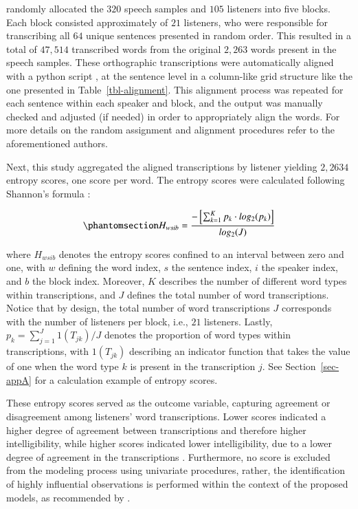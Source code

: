 \documentclass[
  authoryear,
  preprint,
  1p]{elsarticle}
\begin{document}
{\citet{Boonen_et_al_2021} randomly allocated the \(320\) speech samples
and \(105\) listeners into five blocks. Each block consisted
approximately of \(21\) listeners, who were responsible for transcribing
all \(64\) unique sentences presented in random order.} This resulted in
a total of \(47,514\) transcribed words from the original \(2,263\)
words present in the speech samples. These orthographic transcriptions
were automatically aligned with a python script
\citep{Boonen_et_al_2021}, at the sentence level in a column-like grid
structure like the one presented in Table~\ref{tbl-alignment}. This
alignment process was repeated for each sentence within each speaker and
block, and the output was manually checked and adjusted (if needed) in
order to appropriately align the words. {For more details on the random
assignment and alignment procedures refer to the aforementioned
authors.}

Next, this study aggregated the aligned transcriptions by listener
yielding \(2,2634\) entropy scores, one score per word. The entropy
scores were calculated following Shannon's formula
\citeyearpar{Shannon_1948}:

\begin{equation}\phantomsection\label{eq-entropy}{
H_{wsib} = \frac{ -\left[ \sum_{k=1}^{K}  p_{k} \cdot log_{2}(p_{k}) \right] }{ log_{2}(J)}
}\end{equation}

where \(H_{wsib}\) denotes the entropy scores confined to an interval
between zero and one, with \(w\) defining the word index, \(s\) the
sentence index, \(i\) the speaker index, and \(b\) the block index.
Moreover, \(K\) describes the number of different word types within
transcriptions, and \(J\) defines the total number of word
transcriptions. Notice that by design, the total number of word
transcriptions \(J\) corresponds with the number of listeners per block,
i.e., \(21\) listeners. Lastly, \(p_{k} = \sum_{j=1}^{J} 1(T_{jk}) / J\)
denotes the proportion of word types within transcriptions, with
\(1(T_{jk})\) describing an indicator function that takes the value of
one when the word type \(k\) is present in the transcription \(j\). See
Section~\ref{sec-appA} for a calculation example of entropy scores.

These entropy scores served as the outcome variable, capturing agreement
or disagreement among listeners' word transcriptions. Lower scores
indicated a higher degree of agreement between transcriptions and
therefore higher intelligibility, while higher scores indicated lower
intelligibility, due to a lower degree of agreement in the
transcriptions \citep{Boonen_et_al_2021, Faes_et_al_2022}. Furthermore,
no score is excluded from the modeling process using univariate
procedures, rather, the identification of highly influential
observations is performed within the context of the proposed models, as
recommended by \citet{McElreath_2020}.
\end{document}
